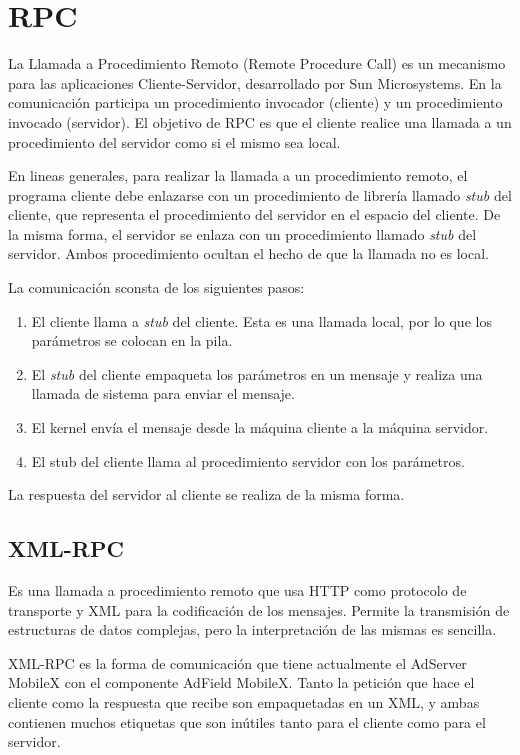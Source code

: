 \section{RPC}

La Llamada a Procedimiento Remoto (Remote Procedure Call) es un mecanismo
para las aplicaciones Cliente-Servidor, desarrollado por Sun Microsystems.
En la comunicación participa un procedimiento invocador (cliente)
y un procedimiento invocado (servidor). El objetivo de RPC es que
el cliente realice una llamada a un procedimiento del servidor como
si el mismo sea local. 

En lineas generales, para realizar la llamada a un procedimiento remoto,
el programa cliente debe enlazarse con un procedimiento de librería
llamado \textit{stub} del cliente, que representa el procedimiento
del servidor en el espacio del cliente. De la misma forma, el servidor
se enlaza con un procedimiento llamado \textit{stub} del servidor.
Ambos procedimiento ocultan el hecho de que la llamada no es local. 

La comunicación sconsta de los siguientes pasos:
\begin{enumerate}
\item El cliente llama a \textit{stub} del cliente. Esta es una llamada
local, por lo que los parámetros se colocan en la pila.
\item El \textit{stub }del cliente empaqueta los parámetros en un mensaje
y realiza una llamada de sistema para enviar el mensaje.
\item El kernel envía el mensaje desde la máquina cliente a la máquina servidor.
\item El stub del cliente llama al procedimiento servidor con los parámetros.
\end{enumerate}
La respuesta del servidor al cliente se realiza de la misma forma.
\cite{Cap4.RPC1}


\subsection{XML-RPC }

Es una llamada a procedimiento remoto que usa HTTP como protocolo
de transporte y XML para la codificación de los mensajes. Permite
la transmisión de estructuras de datos complejas, pero la interpretación
de las mismas es sencilla. \cite{Cap4.XMLRPC}

XML-RPC es la forma de comunicación que tiene actualmente el AdServer
MobileX con el componente AdField MobileX. Tanto la petición que hace
el cliente como la respuesta que recibe son empaquetadas en un XML,
y ambas contienen muchos etiquetas que son inútiles tanto para el
cliente como para el servidor.


